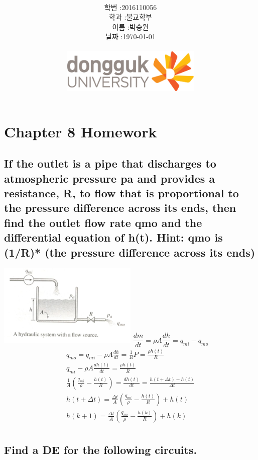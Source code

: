 \documentclass[12pt,a4paper]{article}
\title{
	\centering
	\pgfornament[width=12cm,color=teal]{84}\\
	\vspace{1cm}
	\fontsize{50}{50} \selectfont {정보통신 수학 및 실습\\Homework}\\
		\pgfornament[width=12cm,color=teal]{88}\\
	\vfill}
\author{
	\LARGE
	\begin{tabular}{rl}
		\hline
		학번 : & 2016110056\\ 
		학과 : & 불교학부 \\
		이름 : & 박승원\\
		날짜 : & \today\\
		\hline
	\end{tabular}\vspace{2cm}
	\\
\includegraphics[width=0.5\textwidth]{logo.jpg}
	}
\date{}
\begin{document}
\maketitle
{}
\noindent
\lstset{language=matlab, columns=flexible, tabsize=4, frame=shadowbox, showstringspaces=false, breaklines=true, upquote=true, basicstyle=\normalsize}

\renewcommand{\thesubsubsection}{\alph{subsubsection})}
\renewcommand{\thesubsection}{\arabic{subsection}.}
\newpage

\section*{Chapter 8 Homework}
\subsection{If the outlet is a pipe that discharges to atmospheric pressure pa and provides a resistance, R, to flow that is proportional to the pressure difference across its ends, then find the outlet flow rate qmo and the differential equation of h(t).  Hint: qmo is (1/R)* (the pressure difference across its ends) } 
	
\includegraphics[width=0.5\textwidth]{1.png}
$\dfrac{dm}{dt}=\rho A \dfrac{dh}{dt}=q_{mi}-q_{mo}$
\begin{gather*}
\displaystyle
q_{mo} = q_{mi} - \rho A \frac{dh}{dt}=\frac{1}{R}P = \frac{\rho h(t)}{R}\\
q_{mi}-\rho A \frac{dh(t)}{dt} = \frac{\rho h(t)}{R}\\
\frac{1}{A}(\frac{q_{mi}}{\rho} - \frac{h(t)}{R}) =  \frac{dh(t)}{dt} =
\frac{h(t+\Delta t)-h(t)}{\Delta t} \\
h(t + \Delta t) = \frac{\Delta t}{A}(\frac{q_{mi}}{\rho} - \frac{h(t)}{R}) + h(t)\\
h(k+1) = \frac{\Delta t}{A}(\frac{q_{mi}}{\rho} - \frac{h(k)}{R}) + h(k)\\
\end{gather*}

\subsection{Find a DE for the following circuits.}
\end{document}
